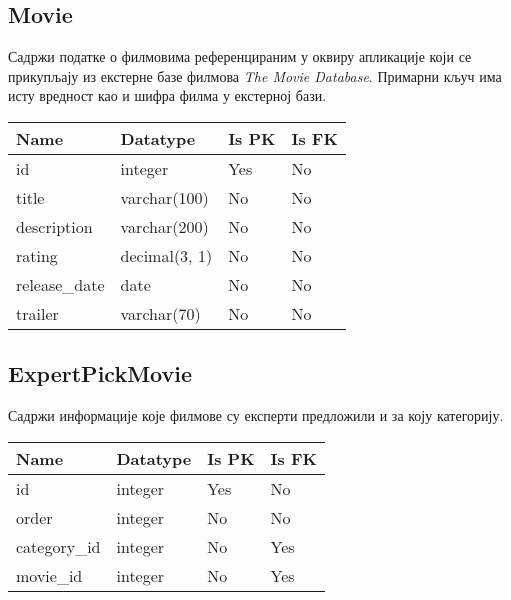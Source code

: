 \subsection{Movie}

Садржи податке о филмовима референцираним у оквиру апликације који се прикупљају из
екстерне базе филмова \textit{The Movie Database}. Примарни кључ има исту вредност као
и шифра филма у екстерној бази.

\vspace{0.5cm}

\noindent
\setcellgapes{4pt}
\makegapedcells
\begin{tabularx}{\linewidth}{|X|X|X|X|}
    \hline
    \textbf{Name} & \textbf{Datatype} & \textbf{Is PK} & \textbf{Is FK} \\
    \hline
    id & integer & Yes & No \\
    \hline
    title & varchar(100) & No & No \\
    \hline
    description & varchar(200) & No & No \\
    \hline
    rating & decimal(3, 1) & No & No \\
    \hline
    release\_date & date & No & No \\
    \hline
    trailer & varchar(70) & No & No \\
    \hline
\end{tabularx}

\subsection{ExpertPickMovie}

Садржи информације које филмове су експерти предложили и за коју категорију.

\vspace{0.5cm}

\noindent
\setcellgapes{4pt}
\makegapedcells
\begin{tabularx}{\linewidth}{|X|X|X|X|}
    \hline
    \textbf{Name} & \textbf{Datatype} & \textbf{Is PK} & \textbf{Is FK} \\
    \hline
    id & integer & Yes & No \\
    \hline
    order & integer & No & No \\
    \hline
    category\_id & integer & No & Yes \\
    \hline
    movie\_id & integer & No & Yes \\
    \hline
\end{tabularx}

